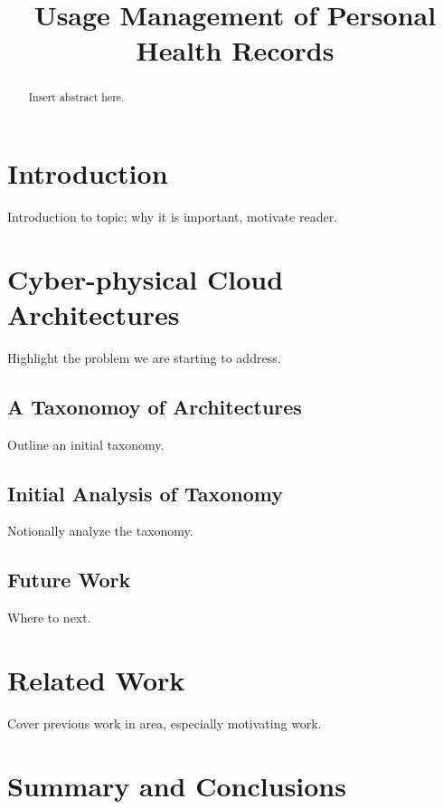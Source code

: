 \documentclass[10pt, conference, compsocconf]{IEEEtran}
\begin{document}
\title{Usage Management of Personal Health Records}

\author{
}



\maketitle

\begin{abstract}
Insert abstract here.
\end{abstract}


\section{Introduction}
Introduction to topic; why it is important, motivate reader.

\section{Cyber-physical Cloud Architectures}
Highlight the problem we are starting to address.

\subsection{A Taxonomoy of Architectures}
Outline an initial taxonomy.

\subsection{Initial Analysis of Taxonomy}
Notionally analyze the taxonomy.

\subsection{Future Work}
Where to next.

\section{Related Work}
Cover previous work in area, especially motivating work.

\section{Summary and Conclusions}






\end{document}
